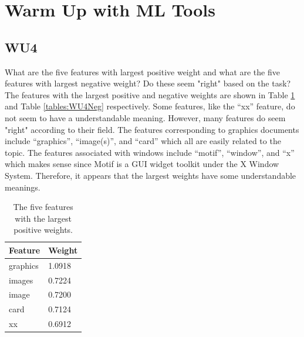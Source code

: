 \documentclass[a4paper,11pt]{article}
\begin{document}
\newpage

\section{Warm Up with ML Tools}
\label{sec:warmup}
\subsection{WU4}
\textsf{What are the five features with largest positive weight and what
are the five features with largest negative weight? Do these seem "right"
based on the task?}\\

The features with the largest positive and negative weights are shown in 
Table \ref{tables:WU4Pos} and Table \ref{tables:WU4Neg} respectively. 
Some features, like the ``xx'' feature, do not seem to have a understandable 
meaning. However, many features do seem "right" according to their field.
The features corresponding to graphics documents include ``graphics'', 
``image(s)'', and ``card'' which all are easily related to the topic. 
The features associated with windows include ``motif'', ``window'', and ``x''
which makes sense since Motif is a GUI widget toolkit under the X Window System. 
Therefore, it appears that the largest weights have some understandable meanings.

\begin{table}[!ht]
\begin{center}
    \begin{tabular}{| l | l |}
    \hline
    Feature  & Weight \\ \hline
    graphics & 1.0918 \\ \hline %
    images   & 0.7224 \\ \hline %
    image    & 0.7200 \\ \hline %
    card     & 0.7124 \\ \hline %
    xx       & 0.6912 \\ \hline %
    \end{tabular}
    \caption{The five features with the largest positive weights.}
    \label{tables:WU4Pos}
\end{center}
\end{table}
\end{document}
